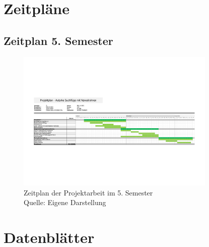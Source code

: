 
\chapter{Zeitpläne}
\newpage
\section{Zeitplan 5. Semester}
\begin{figure}[H]
	\centering
	\includegraphics[angle=90, page=1,width=0.85\textwidth]{anhang/Projektplan.pdf}
	\caption{Zeitplan der Projektarbeit im 5. Semester  \protect \\ Quelle: Eigene Darstellung}
	\label{lab:Projektplan}
\end{figure}



\chapter{Datenblätter}
\newpage
